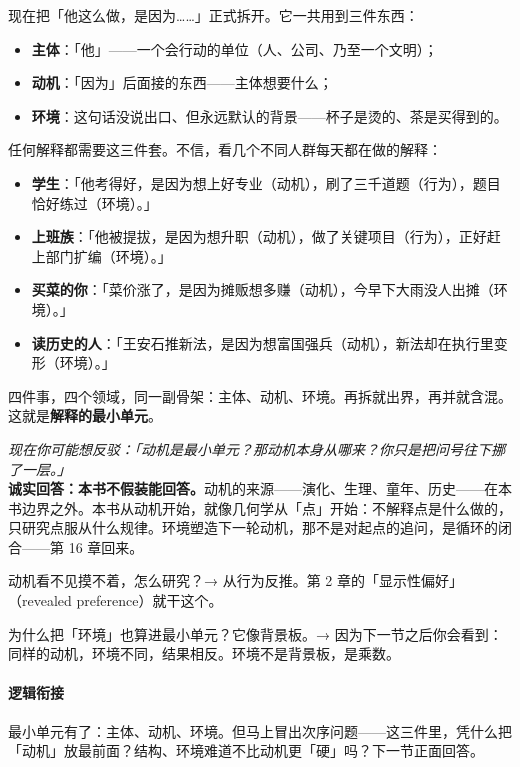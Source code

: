 \documentclass[../../main2.tex]{subfiles}
\begin{document}
现在把「他这么做，是因为……」正式拆开。它一共用到三件东西：

\begin{itemize}
	\item \textbf{主体}：「他」——一个会行动的单位（人、公司、乃至一个文明）；
	\item \textbf{动机}：「因为」后面接的东西——主体想要什么；
	\item \textbf{环境}：这句话没说出口、但永远默认的背景——杯子是烫的、茶是买得到的。
\end{itemize}

任何解释都需要这三件套。不信，看几个不同人群每天都在做的解释：

\begin{itemize}
	\item \textbf{学生}：「他考得好，是因为想上好专业（动机），刷了三千道题（行为），题目恰好练过（环境）。」
	\item \textbf{上班族}：「他被提拔，是因为想升职（动机），做了关键项目（行为），正好赶上部门扩编（环境）。」
	\item \textbf{买菜的你}：「菜价涨了，是因为摊贩想多赚（动机），今早下大雨没人出摊（环境）。」
	\item \textbf{读历史的人}：「王安石推新法，是因为想富国强兵（动机），新法却在执行里变形（环境）。」
\end{itemize}

四件事，四个领域，同一副骨架：主体、动机、环境。再拆就出界，再并就含混。这就是\textbf{解释的最小单元}。

\begin{questionbox}
	\textit{现在你可能想反驳：「动机是最小单元？那动机本身从哪来？你只是把问号往下挪了一层。」}\\
	\textbf{诚实回答：本书不假装能回答。}动机的来源——演化、生理、童年、历史——在本书边界之外。本书从动机开始，就像几何学从「点」开始：不解释点是什么做的，只研究点服从什么规律。环境塑造下一轮动机，那不是对起点的追问，是循环的闭合——第 16 章回来。
\end{questionbox}

\begin{reader_anticipation}
	\item 动机看不见摸不着，怎么研究？→ 从行为反推。第 2 章的「显示性偏好」（revealed preference）就干这个。
	\item 为什么把「环境」也算进最小单元？它像背景板。→ 因为下一节之后你会看到：同样的动机，环境不同，结果相反。环境不是背景板，是乘数。
\end{reader_anticipation}

\paragraph*{逻辑衔接}
	最小单元有了：主体、动机、环境。但马上冒出次序问题——这三件里，凭什么把「动机」放最前面？结构、环境难道不比动机更「硬」吗？下一节正面回答。
\end{document}
